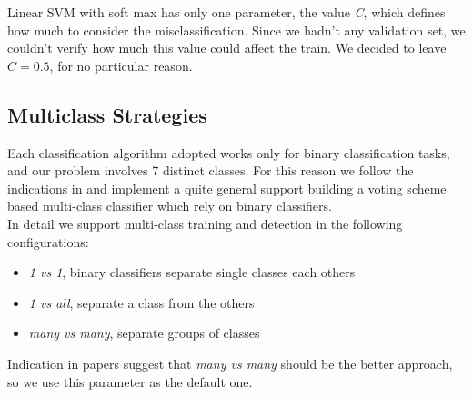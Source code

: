 Linear SVM with soft max has only one parameter, the value \emph{C}, which
defines how much to consider the misclassification. Since we hadn't any
validation set, we couldn't verify how much this value could affect the train.
We decided to leave $C=0.5$, for no particular reason.

\subsection{Multiclass Strategies}

Each classification algorithm adopted works only for binary classification tasks, and our problem involves 7 distinct classes. For this reason we follow the indications in \cite{Littlewort04dynamicsof, Bartlett06fullyautomatic} and implement a quite general support building a voting scheme based multi-class classifier which rely on binary classifiers.\\
In detail we support multi-class training and detection in the following configurations:

\begin{itemize}
\item \emph{1 vs 1}, binary classifiers separate single classes each others
\item \emph{1 vs all}, separate a class from the others
\item \emph{many vs many}, separate groups of classes
\end{itemize}

Indication in papers suggest that \emph{many vs many} should be the better approach, so we use this parameter as the default one.
